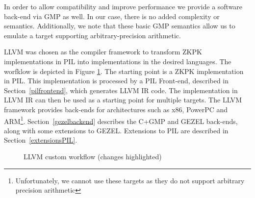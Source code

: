 In order to allow compatibility and improve performance we provide a
software back-end via GMP as well. In our case, there is no added
complexity or semantics. Additionally, we note that these basic GMP
semantics allow us to emulate a target supporting arbitrary-precision
arithmetic.

LLVM was chosen as the compiler framework to transform ZKPK
implementations in PIL into implementations in the desired
languages. The worfklow is depicted in Figure
\ref{fig:custom_llvm_workflow}. The starting point is a ZKPK
implementation in PIL. This implementation is processed by a PIL
Front-end, described in Section~\ref{pilfrontend}, which generates
LLVM IR code. The implementation in LLVM IR can then be used as a
starting point for multiple targets. The LLVM framework provides
back-ends for architectures such as x86, PowerPC and
ARM\footnote{Unfortunately, we cannot use these targets as they do not
  support arbitrary precision arithmetic}. Section~\ref{gezelbackend}
describes the C+GMP and GEZEL back-ends, along with some extensions to GEZEL. Extensions to PIL are 
described in Section~\ref{extensionsPIL}.
\begin{figure}[hb!]
  \centering
  \caption{LLVM custom workflow (changes highlighted)}
  \label{fig:custom_llvm_workflow}
\end{figure}


